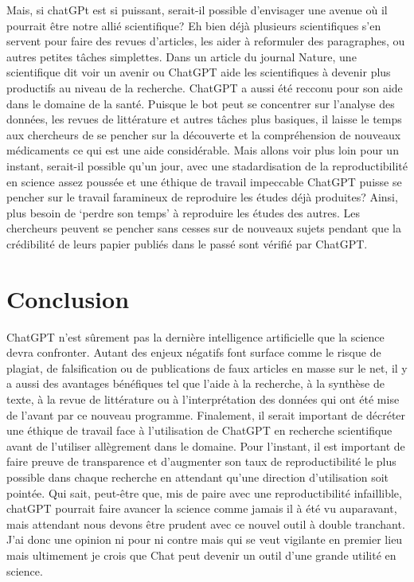 \documentclass[preprint, 3p,
authoryear]{elsarticle} %
\begin{document}
Mais, si chatGPt est si puissant, serait-il possible d'envisager une
avenue où il pourrait être notre allié scientifique? Eh bien déjà
plusieurs scientifiques s'en servent pour faire des revues d'articles,
les aider à reformuler des paragraphes, ou autres petites tâches
simplettes. Dans un article du journal Nature, une scientifique dit voir
un avenir ou ChatGPT aide les scientifiques à devenir plus productifs au
niveau de la recherche. ChatGPT a aussi été recconu pour son aide dans
le domaine de la santé. Puisque le bot peut se concentrer sur l'analyse
des données, les revues de littérature et autres tâches plus basiques,
il laisse le temps aux chercheurs de se pencher sur la découverte et la
compréhension de nouveaux médicaments \citep{sallam_chatgpt_2023} ce qui
est une aide considérable. Mais allons voir plus loin pour un instant,
serait-il possible qu'un jour, avec une stadardisation de la
reproductibilité en science assez poussée et une éthique de travail
impeccable ChatGPT puisse se pencher sur le travail faramineux de
reproduire les études déjà produites? Ainsi, plus besoin de `perdre son
temps' à reproduire les études des autres. Les chercheurs peuvent se
pencher sans cesses sur de nouveaux sujets pendant que la crédibilité de
leurs papier publiés dans le passé sont vérifié par ChatGPT.

\hypertarget{conclusion}{%
\section{\texorpdfstring{\textbf{Conclusion}}{Conclusion}}\label{conclusion}}

ChatGPT n'est sûrement pas la dernière intelligence artificielle que la
science devra confronter. Autant des enjeux négatifs font surface comme
le risque de plagiat, de falsification ou de publications de faux
articles en masse sur le net, il y a aussi des avantages bénéfiques tel
que l'aide à la recherche, à la synthèse de texte, à la revue de
littérature ou à l'interprétation des données qui ont été mise de
l'avant par ce nouveau programme. Finalement, il serait important de
décréter une éthique de travail face à l'utilisation de ChatGPT en
recherche scientifique avant de l'utiliser allègrement dans le domaine.
Pour l'instant, il est important de faire preuve de transparence et
d'augmenter son taux de reproductibilité le plus possible dans chaque
recherche en attendant qu'une direction d'utilisation soit pointée. Qui
sait, peut-être que, mis de paire avec une reproductibilité infaillible,
chatGPT pourrait faire avancer la science comme jamais il à été vu
auparavant, mais attendant nous devons être prudent avec ce nouvel outil
à double tranchant. J'ai donc une opinion ni pour ni contre mais qui se
veut vigilante en premier lieu mais ultimement je crois que Chat peut
devenir un outil d'une grande utilité en science.

\renewcommand\refname{References}

\end{document}
